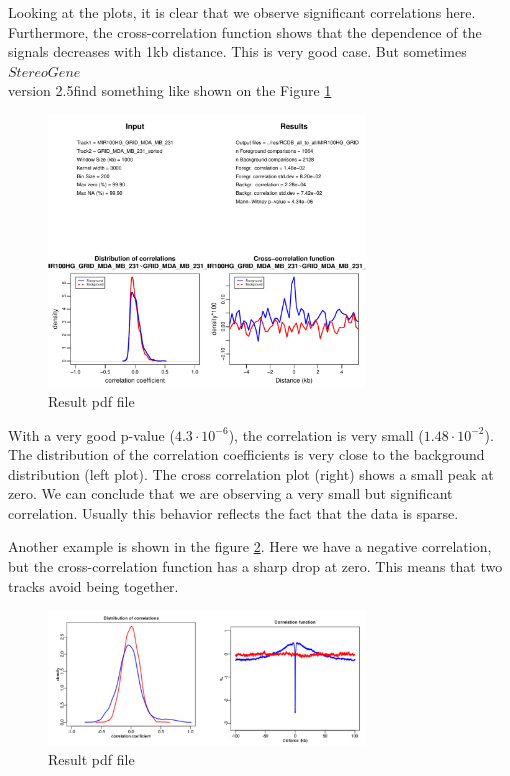 \documentclass{article}
\newcommand{\tw}{\textwidth}
\newcommand{\sg}{$StereoGene$\\ version 2.5}
\begin{document}
Looking at the plots, it is clear that we observe significant correlations here. Furthermore, the cross-correlation function shows that the dependence of the signals decreases with 1kb distance. This is very good case. 
But sometimes \sg find something like shown on the Figure \ref{res2}

\begin{center}
\begin{figure}[!h]
\includegraphics[width=0.75\tw]{fig/mir100~grid_mda.pdf}
\caption{Result pdf file}\label{res2}
\end{figure}
\end{center}

With a very good p-value ($4.3\cdot 10^{-6}$), the correlation is very small ($1.48\cdot 10^{-2}$). The distribution of the correlation coefficients is very close to the background distribution (left plot). The cross correlation plot (right) shows a small peak at zero. We can conclude that we are observing a very small but significant correlation. 
Usually this behavior reflects the fact that the data is sparse.

Another example is shown in the figure \ref{res3}. Here we have a negative correlation, but the cross-correlation function has a sharp drop at zero. This means that two tracks avoid being together.

\begin{center}
\begin{figure}[!h]
\includegraphics[width=0.75\tw]{fig/corr-ptot3.pdf}
\caption{Result pdf file}\label{res3}
\end{figure}
\end{center}
\end{document}

